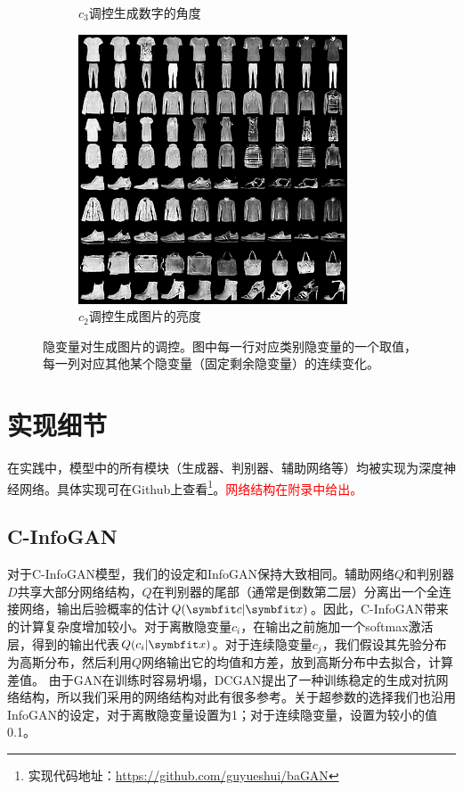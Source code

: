 \begin{figure}[htb]
\begin{subfigure}[b]{\trif\textwidth}
    \caption{$c_3$调控生成数字的角度}
    \label{ffig:m-icg-rotation}
  \end{subfigure} 
  \begin{subfigure}[b]{\trif\textwidth}
    \includegraphics[width=\textwidth]{Img/icg-light.png}
    \caption{$c_2$调控生成图片的亮度}
    \label{ffig:fa-icg-light}
  \end{subfigure} 
  \caption{隐变量对生成图片的调控。图中每一行对应类别隐变量的一个取值，每一列对应其他某个隐变量（固定剩余隐变量）的连续变化。}
  \label{fig:latent-varies}
\end{figure}

\section{实现细节}
在实践中，模型中的所有模块（生成器、判别器、辅助网络等）均被实现为深度神经网络。具体实现可在Github上查看\footnote{实现代码地址：\url{https://github.com/guyueshui/baGAN}}。\textcolor{red}{网络结构在附录中给出。}

\subsection{C-InfoGAN}
对于C-InfoGAN模型，我们的设定和InfoGAN保持大致相同。辅助网络$Q$和判别器$D$共享大部分网络结构，$Q$在判别器的尾部（通常是倒数第二层）分离出一个全连接网络，输出后验概率的估计$Q(\bd{c}|\bd{x})$。因此，C-InfoGAN带来的计算复杂度增加较小。对于离散隐变量$c_i$，在输出之前施加一个softmax激活层，得到的输出代表$Q(c_i|\bd{x})$。对于连续隐变量$c_j$，我们假设其先验分布为高斯分布，然后利用$Q$网络输出它的均值和方差，放到高斯分布中去拟合，计算差值。
由于GAN在训练时容易坍塌，DCGAN\citep{radford2015unsupervised}提出了一种训练稳定的生成对抗网络结构，所以我们采用的网络结构对此有很多参考。关于超参数的选择我们也沿用InfoGAN的设定，对于离散隐变量设置为1；对于连续隐变量，设置为较小的值0.1。

